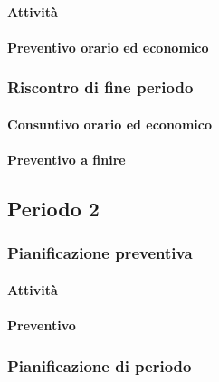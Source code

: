 \paragraph{Attività}

\paragraph{Preventivo orario ed economico}



\subsubsection{Riscontro di fine periodo}


\paragraph{Consuntivo orario ed economico}


\paragraph{Preventivo a finire}





\subsection{Periodo 2}

\subsubsection{Pianificazione preventiva}

\paragraph{Attività}

\planningTable{
	
}

\paragraph{Preventivo}

\subsubsection{Pianificazione di periodo}


